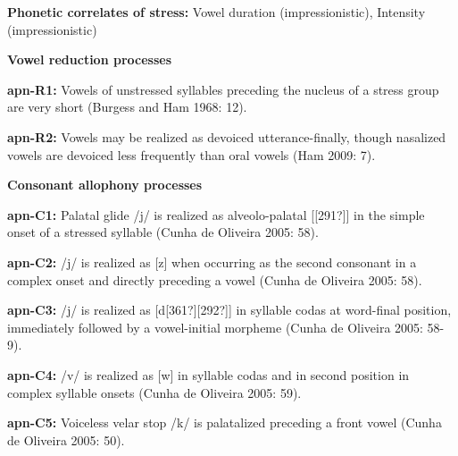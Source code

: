 \begin{styleBody}
\textbf{Phonetic correlates of stress: }Vowel duration (impressionistic), Intensity (impressionistic)
\end{styleBody}

\begin{styleBody}
\textbf{Vowel reduction processes}
\end{styleBody}

\begin{styleBody}
\textbf{apn-R1:} Vowels of unstressed syllables preceding the nucleus of a stress group are very short (Burgess and Ham 1968: 12).
\end{styleBody}

\begin{styleBody}
\textbf{apn-R2:} Vowels may be realized as devoiced utterance-finally, though nasalized vowels are devoiced less frequently than oral vowels (Ham 2009: 7).
\end{styleBody}

\begin{styleBody}
\textbf{Consonant allophony processes}
\end{styleBody}

\begin{styleBody}
\textbf{apn-C1:} Palatal glide /j/ is realized as alveolo-palatal [[291?]] in the simple onset of a stressed syllable (Cunha de Oliveira 2005: 58).
\end{styleBody}

\begin{styleBody}
\textbf{apn-C2:} /j/ is realized as [z] when occurring as the second consonant in a complex onset and directly preceding a vowel (Cunha de Oliveira 2005: 58).
\end{styleBody}

\begin{styleBody}
\textbf{apn-C3:} /j/ is realized as [d[361?][292?]] in syllable codas at word-final position, immediately followed by a vowel-initial morpheme (Cunha de Oliveira 2005: 58-9).
\end{styleBody}

\begin{styleBody}
\textbf{apn-C4:} /v/ is realized as [w] in syllable codas and in second position in complex syllable onsets (Cunha de Oliveira 2005: 59).
\end{styleBody}

\begin{styleBody}
\textbf{apn-C5: }Voiceless velar stop /k/ is palatalized preceding a front vowel (Cunha de Oliveira 2005: 50).
\end{styleBody}

